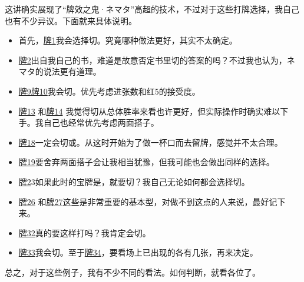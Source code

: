 \vspace*{\fill}
\begin{tcolorbox}[
    title={福地的碎碎念}, fonttitle=\bfseries\Large
]
这讲确实展现了“牌效之鬼·ネマタ”高超的技术，不过对于这些打牌选择，我自己也有不少异议。下面就来具体说明。
\begin{itemize}
    \item 首先，\hyperref[lec6:pai1]{牌1}我会选择切。究竟哪种做法更好，其实不太确定。
    \item\hyperref[lec6:pai2-4]{牌2}出自我自己的书，难道是故意否定书里切的答案的吗？不过我也认为，ネマタ的说法更有道理。
    \item\hyperref[lec6:pai9-12]{牌9}\hyperref[lec6:pai9-12]{牌10}我会切。优先考虑进张数和红5的接受度。
    \item\hyperref[lec6:pai13-14]{牌13} 和\hyperref[lec6:pai13-14]{牌14}
    我觉得切从总体胜率来看也许更好，但实际操作时确实难以下手。我自己也经常优先考虑两面搭子。
    \item\hyperref[lec6:pai16-21]{牌18}一定会切或。从这时开始为了做一杯口而去留牌，感觉并不太合理。
    \item\hyperref[lec6:pai16-21]{牌19}要舍弃两面搭子会让我相当犹豫，但我可能也会做出同样的选择。
    \item\hyperref[lec6:pai2-4]{牌2}3如果此时的宝牌是，就要切？我自己无论如何都会选择切。
    \item\hyperref[lec6:pai24-27]{牌26} 和\hyperref[lec6:pai24-27]{牌27}这些是非常重要的基本型，对做不到这点的人来说，最好记下来。
    \item\hyperref[lec6:pai32]{牌32}真的要这样打吗？我肯定会切。
    \item\hyperref[lec6:pai33-37]{牌33}我会切。至于\hyperref[lec6:pai33-37]{牌34}，要看场上已出现的各有几张，再来决定。
\end{itemize}

总之，对于这些例子，我有不少不同的看法。如何判断，就看各位了。
\end{tcolorbox}